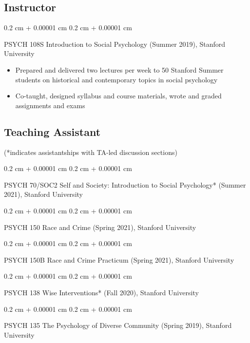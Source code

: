 \documentclass[10pt, letterpaper]{article}
\newenvironment{highlights}{
    \begin{itemize}[
        topsep=0.10 cm,
        parsep=0.10 cm,
        partopsep=0pt,
        itemsep=0pt,
        leftmargin=0.4 cm + 10pt
    ]
}{
    \end{itemize}
} %
\newenvironment{onecolentry}{
    \begin{adjustwidth}{
        0.2 cm + 0.00001 cm
    }{
        0.2 cm + 0.00001 cm
    }
}{
    \end{adjustwidth}
} %
\begin{document}
    \subsection{Instructor}
       \begin{onecolentry}
       PSYCH 108S Introduction to Social Psychology (Summer 2019), Stanford University
        \end{onecolentry}
        \begin{highlights}
                \item Prepared and delivered two lectures per week to 50 Stanford Summer students on historical and contemporary topics in social psychology  
                \item Co-taught, designed syllabus and course materials, wrote and graded assignments and exams 
            \end{highlights}

    \subsection{Teaching Assistant}
    (*indicates assistantships with TA-led discussion sections)
            \vspace{0.2 cm}
       \begin{onecolentry}
       PSYCH 70/SOC2 Self and Society: Introduction to Social Psychology* (Summer 2021), Stanford University
        \end{onecolentry}
        \vspace{0.2 cm}
        \begin{onecolentry}
       PSYCH 150 Race and Crime (Spring 2021), Stanford University
        \end{onecolentry}
        \vspace{0.2 cm}
        \begin{onecolentry}
       PSYCH 150B Race and Crime Practicum (Spring 2021), Stanford University
        \end{onecolentry}
        \vspace{0.2 cm}
        \begin{onecolentry}
        PSYCH 138 Wise Interventions* (Fall 2020), Stanford University
        \end{onecolentry}
        \vspace{0.2 cm}
         
        \begin{onecolentry}
        PSYCH 135 The Psychology of Diverse Community (Spring 2019), Stanford University
        \end{onecolentry}
        \vspace{0.2 cm}
        
\end{document}
